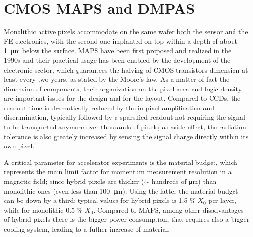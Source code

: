 \section{CMOS MAPS and DMPAS}
   Monolithic active pixels accommodate on the same wafer both the sensor and the FE electronics, with the second one implanted on top within a depth of about \SI{1}{\um} below the surface. 
   MAPS have been first proposed and realized in the 1990s and their practical usage has been enabled by the development of the electronic sector, which guarantees the halving of CMOS transistors dimension at least every two years, as stated by the Moore's law.
   As a matter of fact the dimension of components, their organization on the pixel area and logic density are important issues for the design and for the layout.
   Compared to CCDs, the readout time is dramatically reduced by the in-pixel amplification and discrimination, typically followed by a sparsified readout not requiring the signal to be transported anymore over thousands of pixels; as aside effect, the radiation tolerance is also greately increased by sensing the signal charge directly within its own pixel.

   A critical parameter for accelerator experiments is the material budget, which represents the main limit factor for momentum measurement resolution in a magnetic field; since hybrid pixels are thicker ($\sim$ hundreds of \si{\um}) than monolithic ones (even less than \SI{100}{\um}). Using the latter the material budget can be down by a third: typical values for hybrid pixels is 1.5 \% $X_0$ per layer, while for monolithic 0.5 \% $X_0$. Compared to MAPS, among other disadvantages of hybrid pixels there is the bigger power consumption, that requires also a bigger cooling system, leading to a futher increase of material.

